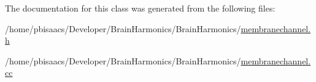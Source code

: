 The documentation for this class was generated from the following files\+:\begin{DoxyCompactItemize}
\item 
/home/pbisaacs/\+Developer/\+Brain\+Harmonics/\+Brain\+Harmonics/\mbox{\hyperlink{membranechannel_8h}{membranechannel.\+h}}\item 
/home/pbisaacs/\+Developer/\+Brain\+Harmonics/\+Brain\+Harmonics/\mbox{\hyperlink{membranechannel_8cc}{membranechannel.\+cc}}\end{DoxyCompactItemize}
